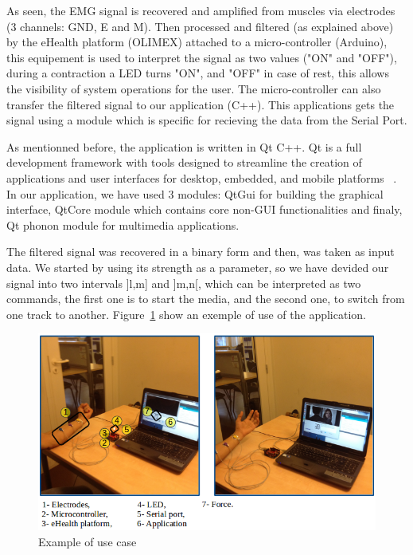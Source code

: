 \documentclass[conference]{IEEEtran}
\begin{document}
As seen, the EMG signal is recovered and amplified from muscles via electrodes (3 channels: GND, E and M). Then processed and filtered (as explained above) by the eHealth platform (OLIMEX) attached to a micro-controller (Arduino), this equipement is used to interpret the signal as two values ("ON" and "OFF"), during a contraction a LED turns "ON", and "OFF" in case of rest, this allows the visibility of system operations for the user. The micro-controller can also transfer the filtered signal to our application (C++). This applications gets the signal using a module which is specific for recieving the data from the Serial Port.\par
As mentionned before, the application is written in Qt C++. Qt is a full development framework with tools designed to streamline the creation of applications and user interfaces for desktop, embedded, and mobile platforms ~\cite{Doc}. In our application, we have used 3 modules: QtGui for building the graphical interface, QtCore module which contains core non-GUI functionalities and finaly, Qt phonon module for multimedia applications.
\par
The filtered signal was recovered in a binary form and then, was taken as input data. We started by using its strength as a parameter, so we have devided our signal into two intervals ]l,m] and ]m,n[, which can be interpreted as two commands, the first one is to start the media, and the second one, to switch from one track to another. Figure~\ref{fig:example} show an exemple of use of the application.

\begin{figure}[!hb]
    \includegraphics[scale=0.30]{app2.png}
    \caption{Example of use case}
    \label{fig:example}
\end{figure}
\end{document}
